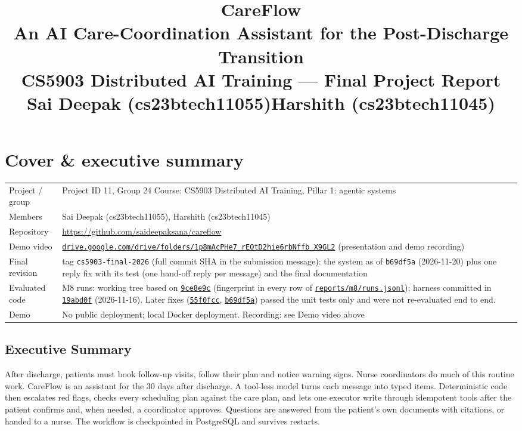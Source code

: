 \documentclass[10pt,a4paper]{article}
\title{\vspace{-2.4cm}\textbf{CareFlow}\\[6pt]
       \large An AI Care-Coordination Assistant for the Post-Discharge Transition\\[4pt]
       \normalsize CS5903 Distributed AI Training --- Final Project Report\\[9pt]
       \normalsize Sai Deepak (cs23btech11055)\quad Harshith (cs23btech11045)}
\author{}
\date{}
\newcommand{\repourl}{https://github.com/saideepaksana/careflow}
\newcommand{\rev}{cs5903-final-2026}
\newcommand{\file}[1]{\href{\repourl/blob/\rev/#1}{\nolinkurl{#1}}}
\newcommand{\commit}[1]{\href{\repourl/commit/#1}{\texttt{#1}}}
\begin{document}
\maketitle
\vspace{-1.4cm}

\section*{Cover \& executive summary}

\begin{center}
\footnotesize
\begin{tabularx}{\textwidth}{P{2.5cm} L}
\toprule
Project / group & Project ID 11, Group 24 \quad Course: CS5903 Distributed AI Training, Pillar 1: agentic systems \\
Members & Sai Deepak (cs23btech11055), Harshith (cs23btech11045) \\
Repository & \url{https://github.com/saideepaksana/careflow} \\
Demo video & \href{https://drive.google.com/drive/folders/1p8mAcPHe7_rEOtD2hie6rbNffb_X9GL2?usp=sharing}{\nolinkurl{drive.google.com/drive/folders/1p8mAcPHe7_rEOtD2hie6rbNffb_X9GL2}} (presentation and demo recording) \\
Final revision & tag \texttt{cs5903-final-2026} (full commit SHA in the submission message): the system as of \texttt{b69df5a} (2026-11-20) plus one reply fix with its test (one hand-off reply per message) and the final documentation \\
Evaluated code & M8 runs: working tree based on \commit{9ce8e9c} (fingerprint in every row of \file{reports/m8/runs.jsonl}); harness committed in \commit{19abd0f} (2026-11-16). Later fixes (\commit{55f0fcc}, \commit{b69df5a}) passed the unit tests only and were not re-evaluated end to end. \\
Demo & No public deployment; local Docker deployment. Recording: see Demo video above \\
\bottomrule
\end{tabularx}
\end{center}

\subsection*{Executive Summary}
After discharge, patients must book follow-up visits, follow their plan and notice warning signs. Nurse coordinators do much of this routine work. CareFlow is an assistant for the 30 days after discharge. A tool-less model turns each message into typed items. Deterministic code then escalates red flags, checks every scheduling plan against the care plan, and lets one executor write through idempotent tools after the patient confirms and, when needed, a coordinator approves. Questions are answered from the patient's own documents with citations, or handed to a nurse. The workflow is checkpointed in PostgreSQL and survives restarts.
\end{document}
